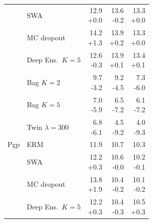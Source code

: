 {\begin{longtable}{llrrr}
     & SWA & \makecell[r]{12.9\\+0.0} & \makecell[r]{13.6\\-0.2} & \makecell[r]{13.3\\+0.0} \\
     & MC dropout & \makecell[r]{14.2\\+1.3} & \makecell[r]{13.9\\+0.2} & \makecell[r]{13.3\\+0.0} \\
     & Deep Ens.\ $K{=}5$ & \makecell[r]{12.6\\-0.3} & \makecell[r]{13.9\\+0.1} & \makecell[r]{13.4\\+0.1} \\
     & Bag $K{=}2$ & \makecell[r]{9.7\\-3.2} & \makecell[r]{9.2\\-4.5} & \makecell[r]{7.3\\-6.0} \\
     & Bag $K{=}5$ & \makecell[r]{7.0\\-5.9} & \makecell[r]{6.5\\-7.2} & \makecell[r]{6.1\\-7.2} \\
     & Twin $\lambda{=}300$ & \makecell[r]{6.8\\-6.1} & \makecell[r]{4.5\\-9.2} & \makecell[r]{4.0\\-9.3} \\
    \midrule
    Pgp & ERM & \makecell[r]{11.9\\\strut} & \makecell[r]{10.7\\\strut} & \makecell[r]{10.3\\\strut} \\
     & SWA & \makecell[r]{12.2\\+0.3} & \makecell[r]{10.6\\-0.0} & \makecell[r]{10.2\\-0.1} \\
     & MC dropout & \makecell[r]{13.8\\+1.9} & \makecell[r]{10.4\\-0.2} & \makecell[r]{10.1\\-0.2} \\
     & Deep Ens.\ $K{=}5$ & \makecell[r]{12.2\\+0.3} & \makecell[r]{10.4\\-0.3} & \makecell[r]{10.5\\+0.3} \\

\end{longtable}}
